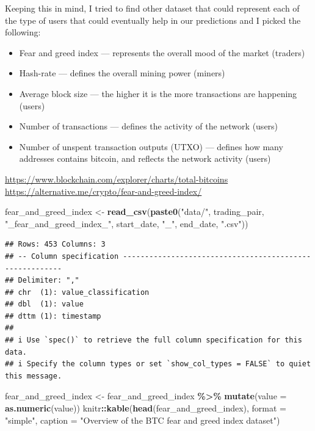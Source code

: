 \documentclass[
]{article}
\newenvironment{Shaded}{\begin{snugshade}}{\end{snugshade}}
\newcommand{\AttributeTok}[1]{\textcolor[rgb]{0.13,0.29,0.53}{#1}}
\newcommand{\FunctionTok}[1]{\textcolor[rgb]{0.13,0.29,0.53}{\textbf{#1}}}
\newcommand{\NormalTok}[1]{#1}
\newcommand{\OtherTok}[1]{\textcolor[rgb]{0.56,0.35,0.01}{#1}}
\newcommand{\SpecialCharTok}[1]{\textcolor[rgb]{0.81,0.36,0.00}{\textbf{#1}}}
\newcommand{\StringTok}[1]{\textcolor[rgb]{0.31,0.60,0.02}{#1}}
\begin{document}
Keeping this in mind, I tried to find other dataset that could represent
each of the type of users that could eventually help in our predictions
and I picked the following:

\begin{itemize}
\item
  Fear and greed index --- represents the overall mood of the market
  (traders)
\item
  Hash-rate --- defines the overall mining power (miners)
\item
  Average block size --- the higher it is the more transactions are
  happening (users)
\item
  Number of transactions --- defines the activity of the network (users)
\item
  Number of unspent transaction outputs (UTXO) --- defines how many
  addresses contains bitcoin, and reflects the network activity (users)
\end{itemize}

\url{https://www.blockchain.com/explorer/charts/total-bitcoins}
\url{https://alternative.me/crypto/fear-and-greed-index/}

\begin{Shaded}
\begin{Highlighting}[]
\NormalTok{fear\_and\_greed\_index }\OtherTok{\textless{}{-}} \FunctionTok{read\_csv}\NormalTok{(}\FunctionTok{paste0}\NormalTok{(}\StringTok{"data/"}\NormalTok{, trading\_pair,}
    \StringTok{"\_fear\_and\_greed\_index\_"}\NormalTok{, start\_date, }\StringTok{"\_"}\NormalTok{, end\_date, }\StringTok{".csv"}\NormalTok{))}
\end{Highlighting}
\end{Shaded}

\begin{verbatim}
## Rows: 453 Columns: 3
## -- Column specification --------------------------------------------------------
## Delimiter: ","
## chr  (1): value_classification
## dbl  (1): value
## dttm (1): timestamp
## 
## i Use `spec()` to retrieve the full column specification for this data.
## i Specify the column types or set `show_col_types = FALSE` to quiet this message.
\end{verbatim}

\begin{Shaded}
\begin{Highlighting}[]
\NormalTok{fear\_and\_greed\_index }\OtherTok{\textless{}{-}}\NormalTok{ fear\_and\_greed\_index }\SpecialCharTok{\%\textgreater{}\%}
    \FunctionTok{mutate}\NormalTok{(}\AttributeTok{value =} \FunctionTok{as.numeric}\NormalTok{(value))}
\NormalTok{knitr}\SpecialCharTok{::}\FunctionTok{kable}\NormalTok{(}\FunctionTok{head}\NormalTok{(fear\_and\_greed\_index), }\AttributeTok{format =} \StringTok{"simple"}\NormalTok{, }\AttributeTok{caption =} \StringTok{"Overview of the BTC fear and greed index dataset"}\NormalTok{)}
\end{Highlighting}
\end{Shaded}
\end{document}
